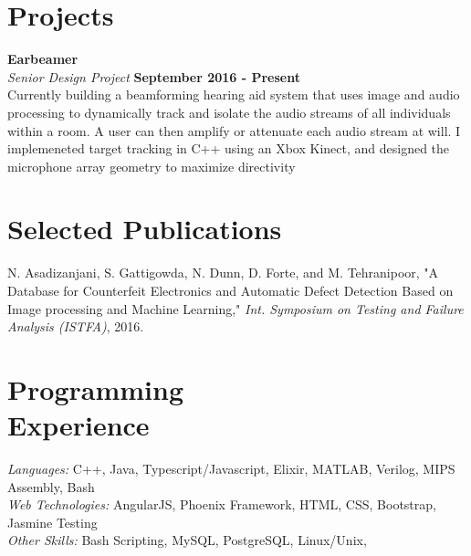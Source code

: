 \documentclass[margin,line]{resume}
\begin{document}
\begin{resume}
\section{\mysidestyle Projects}

    \textbf{Earbeamer}\vspace{2mm}\\\vspace{1mm}%
    \textsl{Senior Design Project} \hfill \textbf{September 2016 - Present}\\
    Currently building a beamforming hearing aid system that uses image and audio processing to dynamically track and isolate the audio streams of all individuals within a room. A user can then amplify or attenuate each audio stream at will. I implemeneted target tracking in C++ using an Xbox Kinect, and designed the microphone array geometry to maximize directivity

   \section{\mysidestyle Selected Publications}
   N. Asadizanjani, S. Gattigowda, N. Dunn, D. Forte, and M. Tehranipoor, "A Database for Counterfeit Electronics and Automatic Defect Detection Based on Image processing and Machine Learning," \textsl{Int. Symposium on Testing and Failure Analysis (ISTFA)}, 2016.
\vspace{-2mm}

    \section{\mysidestyle Programming\\Experience}

    \emph{Languages:} C++, Java, Typescript/Javascript, Elixir, MATLAB, Verilog, MIPS Assembly, Bash\\
    \emph{Web Technologies:} AngularJS, Phoenix Framework, HTML, CSS, Bootstrap, Jasmine Testing\\
    \emph{Other Skills:} Bash Scripting, MySQL, PostgreSQL, Linux/Unix,
\end{resume}
\end{document}
